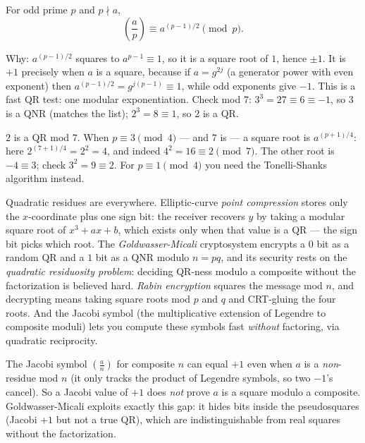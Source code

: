 \begin{theorem}
\label{ch40:thm-eulercrit}
For odd prime $p$ and $p\nmid a$,
\[
  \left(\frac{a}{p}\right) \equiv a^{(p-1)/2} \pmod p.
\]
\end{theorem}

Why: $a^{(p-1)/2}$ squares to $a^{p-1}\equiv 1$, so it is a square root of $1$, hence $\pm 1$. It is
$+1$ precisely when $a$ is a square, because if $a=g^{2j}$ (a generator power with even exponent) then
$a^{(p-1)/2}=g^{j(p-1)}\equiv 1$, while odd exponents give $-1$. This is a fast QR test: one modular
exponentiation. Check mod $7$: $3^{3}=27\equiv 6\equiv -1$, so $3$ is a QNR (matches the list);
$2^{3}=8\equiv 1$, so $2$ is a QR.

\begin{example}
\label{ch40:ex-sqrt}
$2$ is a QR mod $7$. When $p\equiv 3\pmod 4$ --- and $7$ is --- a square root is $a^{(p+1)/4}$:
here $2^{(7+1)/4}=2^2=4$, and indeed $4^2=16\equiv 2\pmod 7$. The other root is $-4\equiv 3$; check
$3^2 = 9\equiv 2$. For $p\equiv 1\pmod 4$ you need the Tonelli-Shanks algorithm instead.
\end{example}

\begin{applicationbox}
Quadratic residues are everywhere. Elliptic-curve \emph{point compression} stores only the
$x$-coordinate plus one sign bit: the receiver recovers $y$ by taking a modular square root of
$x^3+ax+b$, which exists only when that value is a QR --- the sign bit picks which root. The
\emph{Goldwasser-Micali} cryptosystem encrypts a $0$ bit as a random QR and a $1$ bit as a
QNR modulo $n=pq$, and its security rests on the \emph{quadratic residuosity problem}: deciding
QR-ness modulo a composite without the factorization is believed hard. \emph{Rabin encryption}
squares the message mod $n$, and decrypting means taking square roots mod $p$ and $q$ and CRT-gluing
the four roots. And the Jacobi symbol (the multiplicative extension of Legendre to composite moduli) lets you compute these symbols fast \emph{without} factoring, via quadratic reciprocity.
\end{applicationbox}

\begin{trapbox}
The Jacobi symbol $\left(\tfrac{a}{n}\right)$ for composite $n$ can equal $+1$ even when $a$ is a
\emph{non}-residue mod $n$ (it only tracks the product of Legendre symbols, so two $-1$'s cancel). So
a Jacobi value of $+1$ does \emph{not} prove $a$ is a square modulo a composite. Goldwasser-Micali
exploits exactly this gap: it hides bits inside the pseudosquares (Jacobi $+1$ but not a true QR),
which are indistinguishable from real squares without the factorization.
\end{trapbox}

